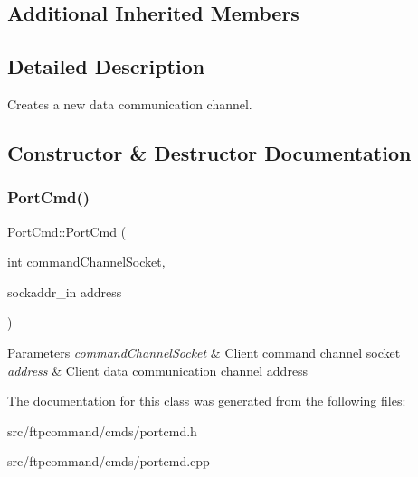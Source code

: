 \subsection*{Additional Inherited Members}


\subsection{Detailed Description}
Creates a new data communication channel. 

\subsection{Constructor \& Destructor Documentation}
\mbox{\label{classPortCmd_a08f48a9a7287459f6e8fae280a7b4557}} 
\subsubsection{\texorpdfstring{Port\+Cmd()}{PortCmd()}}
{\footnotesize\ttfamily Port\+Cmd\+::\+Port\+Cmd (\begin{DoxyParamCaption}\item[{int}]{command\+Channel\+Socket,  }\item[{sockaddr\+\_\+in}]{address }\end{DoxyParamCaption})}


\begin{DoxyParams}{Parameters}
{\em command\+Channel\+Socket} & Client command channel socket \\
\hline
{\em address} & Client data communication channel address \\
\hline
\end{DoxyParams}


The documentation for this class was generated from the following files\+:\begin{DoxyCompactItemize}
\item 
src/ftpcommand/cmds/portcmd.\+h\item 
src/ftpcommand/cmds/portcmd.\+cpp\end{DoxyCompactItemize}
